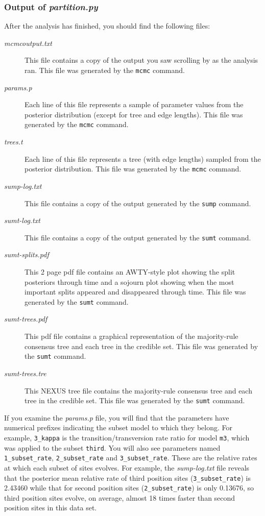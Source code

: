 \documentclass[10pt]{article}
\newcommand{\pathname}[1]{{\em #1}}				%
\newcommand{\code}[1]{{\tt #1}}					%
\newcommand{\cmd}[1]{{\tt \small #1}\index{#1}}	%
\begin{document}
\subsubsection{Output of \pathname{partition.py}}
After the analysis has finished, you should find the following files:
\begin{description}
\item[\pathname{mcmcoutput.txt}] This file contains a copy of the output you saw scrolling by as the analysis ran. This file was generated by the \cmd{mcmc} command.
\item[\pathname{params.p}] Each line of this file represents a sample of parameter values from the posterior distribution (except for tree and edge lengths). This file was generated by the \cmd{mcmc} command.
\item[\pathname{trees.t}] Each line of this file represents a tree (with edge lengths) sampled from the posterior distribution. This file was generated by the \cmd{mcmc} command.
\item[\pathname{sump-log.txt}] This file contains a copy of the output generated by the \cmd{sump} command.
\item[\pathname{sumt-log.txt}] This file contains a copy of the output generated by the \cmd{sumt} command.
\item[\pathname{sumt-splits.pdf}] This 2 page pdf file contains an AWTY-style plot showing the split posteriors through time and a sojourn plot showing when the most important splits appeared and disappeared through time. This file was generated by the \cmd{sumt} command.
\item[\pathname{sumt-trees.pdf}] This pdf file contains a graphical representation of the majority-rule consensus tree and each tree in the credible set. This file was generated by the \cmd{sumt} command.
\item[\pathname{sumt-trees.tre}] This NEXUS tree file contains the majority-rule consensus tree and each tree in the credible set. This file was generated by the \cmd{sumt} command.
\end{description}

If you examine the \pathname{params.p} file, you will find that the parameters have numerical prefixes indicating the subset model to which they belong. For example, \code{3\_kappa} is the transition/transversion rate ratio for model \code{m3}, which was applied to the subset \code{third}. You will also see parameters named \code{1\_subset\_rate}, \code{2\_subset\_rate} and \code{3\_subset\_rate}. These are the relative rates at which each subset of sites evolves. For example, the \pathname{sump-log.txt} file reveals that the posterior mean relative rate of third position sites (\code{3\_subset\_rate}) is 2.43460 while that for second position sites (\code{2\_subset\_rate}) is only 0.13676, so third position sites evolve, on average, almost 18 times faster than second position sites in this data set.
\end{document}
